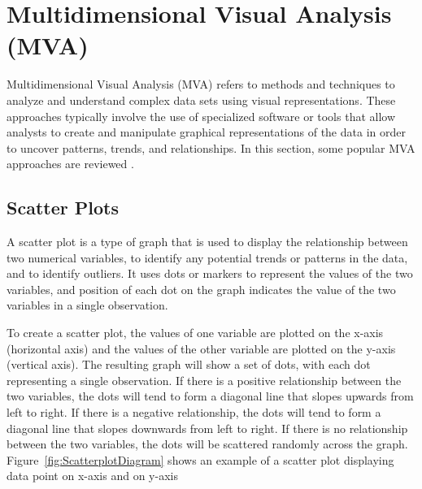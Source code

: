 
\chapter{Multidimensional Visual Analysis (MVA)}

\label{chap:MVA}

Multidimensional Visual Analysis (MVA) refers to methods and techniques to
analyze and understand complex data sets using visual representations.
These approaches typically involve the use of specialized software or
tools that allow analysts to create and manipulate graphical
representations of the data in order to uncover patterns, trends, and
relationships. In this section, some popular MVA approaches are reviewed
\parencites{cao2011mva}[Chapter~2]{dzemyda2012mva}.



\section{Scatter Plots}

A scatter plot is a type of graph that is used to display the
relationship between two numerical variables, to identify any
potential trends or patterns in the data, and to identify outliers. It
uses dots or markers to represent the values of the two variables, and
position of each dot on the graph indicates the value of the two
variables in a single observation.

To create a scatter plot, the values of one variable are plotted on the
x-axis (horizontal axis) and the values of the other variable are plotted
on the y-axis (vertical axis). The resulting graph will show a set of
dots, with each dot representing a single observation. If there is a
positive relationship between the two variables, the dots will tend to
form a diagonal line that slopes upwards from left to right. If there is a
negative relationship, the dots will tend to form a diagonal line that
slopes downwards from left to right. If there is no relationship between
the two variables, the dots will be scattered randomly across the graph.
Figure~\ref{fig:ScatterplotDiagram} shows an example of a scatter plot
displaying data point on x-axis and on y-axis

